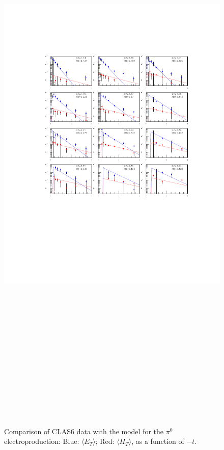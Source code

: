 \documentclass[prc,floatfix,superscriptaddress]{revtex4}
\newcommand{\GPDHT}{\langle H_T \rangle}
\newcommand{\GPDETbar}{\langle \bar{E}_T \rangle}
\begin{document}

\begin{figure}[t!]
\vspace*{-10 mm}
\centerline{
\includegraphics[height=30cm]{../Test_plots/pi0_HT2_ET2.pdf}
}
\label{pi0_gff}
\vspace*{-70mm}
\caption{Comparison of CLAS6 data with the model for the $\pi^0$ electroproduction:
Blue: $\GPDETbar$;
Red: $\GPDHT$,  as a function of $-t$.
}
\label{fig:pi0_gff}
\end{figure}
\end{document}
